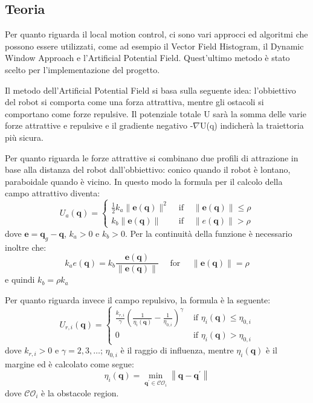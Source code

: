 \documentclass[Lau, binding=0.6cm, oneside]{sapthesis}
\begin{document}
\subsection{Teoria}
Per quanto riguarda il local motion control, ci sono vari approcci ed algoritmi che possono essere utilizzati, come ad esempio il Vector Field Histogram, il Dynamic Window Approach e l'Artificial Potential Field.
Quest'ultimo metodo è stato scelto per l'implementazione del progetto.

Il metodo dell'Artificial Potential Field si basa sulla seguente idea: l'obbiettivo del robot si comporta come una forza attrattiva, mentre gli ostacoli si comportano come forze repulsive.
Il potenziale totale U sarà la somma delle varie forze attrattive e repulsive e il gradiente negativo -$\nabla$U(q) indicherà la traiettoria più sicura.

Per quanto riguarda le forze attrattive si combinano due profili di attrazione in base alla distanza del robot dall'obbiettivo: conico quando il robot è lontano, paraboidale quando è vicino.
In questo modo la formula per il calcolo della campo attrattivo diventa:
\newline
$$
U_{a}(\boldsymbol{q})=\left\{\begin{array}{cll}
\frac{1}{2} k_{a}\|\boldsymbol{e}(\boldsymbol{q})\|^{2} & \text { if } & \|\boldsymbol{e}(\boldsymbol{q})\| \leq \rho \\
k_{b}\|\boldsymbol{e}(\boldsymbol{q})\| & \text { if } & \|e(\boldsymbol{q})\|>\rho
\end{array}\right.
$$
\newline
dove $\boldsymbol{e}=\boldsymbol{q}_{g}-\boldsymbol{q}$, $k_{a}>0$ e $k_{b}>0$.
Per la continuità della funzione è necessario inoltre che:
$$
k_{a} e(\boldsymbol{q})=k_{b} \frac{\boldsymbol{e}(\boldsymbol{q})}{\|\boldsymbol{e}(\boldsymbol{q})\|} \quad \text { for } \quad\|\boldsymbol{e}(\boldsymbol{q})\|=\rho
$$
\newline
e quindi $k_{b}=\rho k_{a}$

Per quanto riguarda invece il campo repulsivo, la formula è la seguente:
\newline
$$
U_{r, i}(\boldsymbol{q})=\left\{\begin{array}{ll}
\frac{k_{r, i}}{\gamma}\left(\frac{1}{\eta_{i}(\boldsymbol{q})}-\frac{1}{\eta_{0, i}}\right)^{\gamma} & \text { if } \eta_{i}(\boldsymbol{q}) \leq \eta_{0, i} \\
0 & \text { if } \eta_{i}(\boldsymbol{q})>\eta_{0, i}
\end{array}\right.
$$
\newline
dove $k_{r, i}>0$ e $\gamma=2,3, \ldots$; $\eta_{0, i}$ è il raggio di influenza, mentre $\eta_{i}(\boldsymbol{q})$ è il margine ed è calcolato come segue:
$$
\eta_{i}(\boldsymbol{q})=\min _{\boldsymbol{q}^{\prime} \in \mathcal{C O}_{i}}\left\|\boldsymbol{q}-\boldsymbol{q}^{\prime}\right\|
$$
\newline
dove $\mathcal{C O}_{i}$ è la obstacole region.
\end{document}
